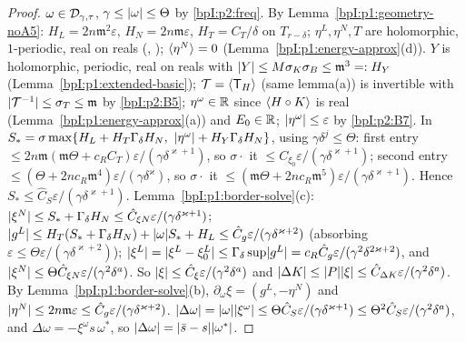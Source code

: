 \begin{proof}
\label{stepI:p2:co-data}
$\omega\in\mathcal{D}_{\gamma,\tau}$, $\gamma\le\lvert \omega\rvert\le\Theta$ by \eqref{bpI:p2:freq}. By Lemma~\ref{bpI:p1:geometry-noA5}: $H_L=2n\mathfrak m^2\varepsilon$, $H_N=2n\mathfrak m\varepsilon$, $H_T=C_T/\delta$ on $T_{r-\delta}$; $\eta^L,\eta^N,T$ are holomorphic, $1$-periodic, real on reals (, ); $\langle \eta^N\rangle=0$ (Lemma~\ref{bpI:p1:energy-approx}(d)). $Y$ is holomorphic, periodic, real on reals with $\lvert Y\rvert\le M\sigma_K\sigma_B\le\mathfrak m^3=:H_Y$ (Lemma~\ref{bpI:p1:extended-basic}); $\mathcal T=\langle \mathsf T_H\rangle$ (same lemma(a)) is invertible with $\lvert \mathcal T^{-1}\rvert\le\sigma_T\le\mathfrak m$ by \ref{bpI:p2:B5}; $\eta^\omega\in\mathbb{R}$ since $\langle H\circ K\rangle$ is real (Lemma~\ref{bpI:p1:energy-approx}(a)) and $E_0\in\mathbb{R}$; $\lvert \eta^\omega\rvert\le\varepsilon$ by \ref{bpI:p2:B7}.
\label{stepI:p2:co-xi0}
In $S_*=\sigma\max\{H_L+H_T\Gamma_\delta H_N,\ \abs{\eta^\omega}+H_Y\Gamma_\delta H_N\}$, using $\gamma\delta^j\le\Theta$: first entry $\le2n\mathfrak m(\mathfrak m\Theta+c_RC_T)\varepsilon/(\gamma\delta^{\varkappa+1})$, so $\sigma\cdot$ it $\le C_{\xi_0}\varepsilon/(\gamma\delta^{\varkappa+1})$; second entry $\le(\Theta+2nc_R\mathfrak m^4)\varepsilon/(\gamma\delta^\varkappa)$, so $\sigma\cdot$ it $\le(\mathfrak m\Theta+2nc_R\mathfrak m^5)\varepsilon/(\gamma\delta^{\varkappa+1})$. Hence $S_*\le\hat C_S\varepsilon/(\gamma\delta^{\varkappa+1})$.
\label{stepI:p2:co-xi}
Lemma~\ref{bpI:p1:border-solve}(c): $\lvert \xi^N\rvert\le S_*+\Gamma_\delta H_N\le\hat C_{\xi N}\varepsilon/(\gamma\delta^{\varkappa+1})$;
$\lvert g^L\rvert\le H_T(S_*+\Gamma_\delta H_N)+\lvert \omega\rvert S_*+H_L\le\hat C_g\varepsilon/(\gamma\delta^{\varkappa+2})$ (absorbing $\varepsilon\le\Theta\varepsilon/(\gamma\delta^{\varkappa+2})$);
$\lvert \xi^L\rvert=\lvert \xi^L-\xi^L_0\rvert\le\Gamma_\delta\sup\lvert g^L\rvert=c_R\hat C_g\varepsilon/(\gamma^2\delta^{2\varkappa+2})$, and $\lvert \xi^N\rvert\le\Theta\hat C_{\xi N}\varepsilon/(\gamma^2\delta^a)$. So $\lvert \xi\rvert\le\hat C_\xi\varepsilon/(\gamma^2\delta^a)$ and $\lvert \Delta K\rvert\le\lvert P\rvert\lvert \xi\rvert\le\hat C_{\Delta K}\varepsilon/(\gamma^2\delta^a)$. By Lemma~\ref{bpI:p1:border-solve}(b), $\partial_\omega\xi=(g^L,-\eta^N)$ and $\lvert \eta^N\rvert\le2n\mathfrak m\varepsilon\le\hat C_g\varepsilon/(\gamma\delta^{\varkappa+2})$.
\label{stepI:p2:co-omega}
$\lvert \Delta\omega\rvert=\lvert \omega\rvert\lvert \xi^\omega\rvert\le\Theta\hat C_S\varepsilon/(\gamma\delta^{\varkappa+1})\le\Theta^2\hat C_S\varepsilon/(\gamma^2\delta^a)$, and $\Delta\omega=-\xi^\omega s\,\omega^*$, so $\lvert \Delta\omega\rvert=\lvert \bar s-s\rvert\lvert \omega^*\rvert$.

\end{proof}
